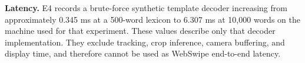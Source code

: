 \textbf{Latency.} E4 records a brute-force synthetic template decoder increasing from approximately 0.345 ms at a 500-word lexicon to 6.307 ms at 10,000 words on the machine used for that experiment. These values describe only that decoder implementation. They exclude tracking, crop inference, camera buffering, and display time, and therefore cannot be used as WebSwipe end-to-end latency.

